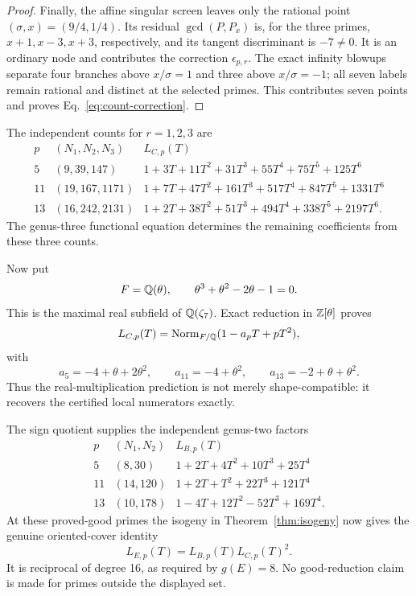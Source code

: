 \begin{proof}
Finally, the affine singular screen leaves only the rational point
$(\sigma,x)=(9/4,1/4)$.  Its residual $\gcd(P,P_x)$ is, for the three primes,
$x+1,x-3,x+3$, respectively, and its tangent discriminant is $-7\ne0$.
It is an ordinary node and contributes the correction $\epsilon_{p,r}$.
The exact infinity blowups separate four branches above $x/\sigma=1$ and
three above $x/\sigma=-1$; all seven labels remain rational and distinct at
the selected primes.  This contributes seven points and proves
Eq.~\eqref{eq:count-correction}.
\end{proof}

The independent counts for $r=1,2,3$ are
\begin{equation}\label{eq:c-counts}
\begin{array}{c|c|l}
p&(N_1,N_2,N_3)&L_{C,p}(T)\\ \hline
5&(9,39,147)&
1+3T+11T^2+31T^3+55T^4+75T^5+125T^6\\
11&(19,167,1171)&
1+7T+47T^2+161T^3+517T^4+847T^5+1331T^6\\
13&(16,242,2131)&
1+2T+38T^2+51T^3+494T^4+338T^5+2197T^6.
\end{array}
\end{equation}
The genus-three functional equation determines the remaining coefficients
from these three counts.

Now put
\[
 F=\mathbb Q(\theta),\qquad \theta^3+\theta^2-2\theta-1=0.
\]
This is the maximal real subfield of $\mathbb Q(\zeta_7)$.  Exact reduction in
$\mathbb Z[\theta]$ proves
\begin{equation}\label{eq:norm-law}
 L_{C,p}(T)=\operatorname{Norm}_{F/\mathbb Q}(1-a_pT+pT^2),
\end{equation}
with
\[
 a_5=-4+\theta+2\theta^2,\qquad
 a_{11}=-4+\theta^2,\qquad
 a_{13}=-2+\theta+\theta^2.
\]
Thus the real-multiplication prediction is not merely shape-compatible: it
recovers the certified local numerators exactly.

The sign quotient supplies the independent genus-two factors
\begin{equation}\label{eq:b-factors}
\begin{array}{c|c|l}
p&(N_1,N_2)&L_{B,p}(T)\\ \hline
5&(8,30)&1+2T+4T^2+10T^3+25T^4\\
11&(14,120)&1+2T+T^2+22T^3+121T^4\\
13&(10,178)&1-4T+12T^2-52T^3+169T^4.
\end{array}
\end{equation}
At these proved-good primes the isogeny in Theorem~\ref{thm:isogeny} now
gives the genuine oriented-cover identity
\begin{equation}\label{eq:e-factor}
 \boxed{L_{E,p}(T)=L_{B,p}(T)L_{C,p}(T)^2.}
\end{equation}
It is reciprocal of degree 16, as required by $g(E)=8$.  No good-reduction
claim is made for primes outside the displayed set.
